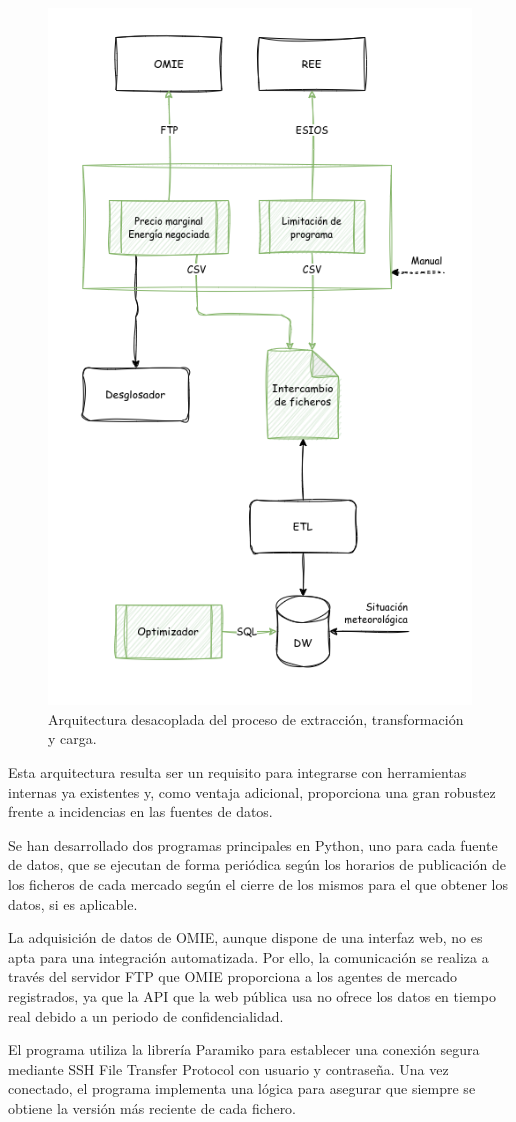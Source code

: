 \begin{figure}
  \centering
  \includegraphics[width=0.5\linewidth]{figures/arquitectura-mercado.png}
  \caption{Arquitectura desacoplada del proceso de extracción, transformación y carga.}
  \label{fig:arquitectura-mercado}
\end{figure}

Esta arquitectura resulta ser un requisito para integrarse con herramientas internas ya existentes y, como ventaja adicional, proporciona una gran robustez frente a incidencias en las fuentes de datos.

Se han desarrollado dos programas principales en Python, uno para cada fuente de datos, que se ejecutan de forma periódica según los horarios de publicación de los ficheros de cada mercado según el cierre de los mismos para el que obtener los datos, si es aplicable.

La adquisición de datos de OMIE, aunque dispone de una interfaz web, no es apta para una integración automatizada. Por ello, la comunicación se realiza a través del servidor FTP que OMIE proporciona a los agentes de mercado registrados, ya que la API que la web pública usa no ofrece los datos en tiempo real debido a un periodo de confidencialidad.

El programa utiliza la librería Paramiko para establecer una conexión segura mediante SSH File Transfer Protocol con usuario y contraseña. Una vez conectado, el programa implementa una lógica para asegurar que siempre se obtiene la versión más reciente de cada fichero.

